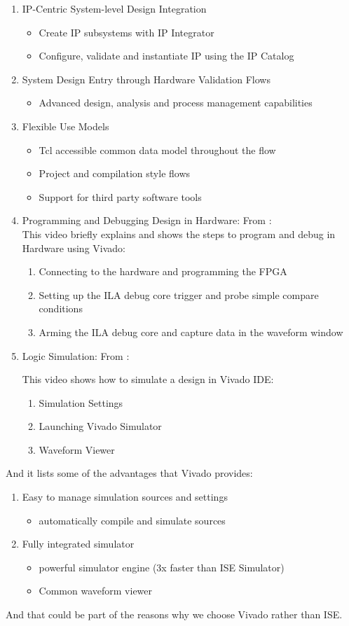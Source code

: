 \begin{enumerate}
\item IP-Centric System-level Design Integration
\begin{itemize}
\item Create IP subsystems with IP Integrator
\item Configure, validate and instantiate IP using the IP Catalog
\end{itemize}
\item System Design Entry through Hardware Validation Flows
\begin{itemize}
\item Advanced design, analysis and process management capabilities
\end{itemize}
\item Flexible Use Models
\begin{itemize}
\item Tcl accessible common data model throughout the flow
\item Project and compilation style flows
\item Support for third party software tools
\end{itemize}
\item Programming and Debugging Design in Hardware: From \cite{60}:\\
This video briefly explains and shows the steps to program and debug
in Hardware using Vivado:
\begin{enumerate}
\item Connecting to the hardware and programming the FPGA
\item Setting up the ILA debug core trigger and probe simple compare conditions
\item Arming the ILA debug core and capture data in the waveform window
\end{enumerate}
\item Logic Simulation: From \cite{61}:

This video shows how to simulate a design in Vivado IDE:
\begin{enumerate}
\item Simulation Settings
\item Launching Vivado Simulator
\item Waveform Viewer
\end{enumerate}
\end{enumerate}

And it lists some of the advantages that Vivado provides:
\begin{enumerate}
\item Easy to manage simulation sources and settings
\begin{itemize}
\item automatically compile and simulate sources
\end{itemize}
\item Fully integrated simulator
\begin{itemize}
\item powerful simulator engine (3x faster than ISE Simulator)
\item Common waveform viewer
\end{itemize}
\end{enumerate}

And that could be part of the reasons why we choose Vivado rather than ISE.

